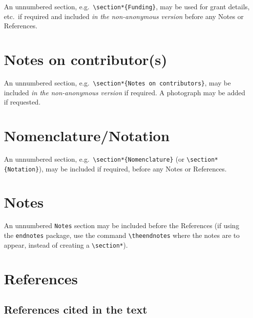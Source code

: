 \documentclass[]{interact}
\theoremstyle{plain}%
\theoremstyle{definition}
\theoremstyle{remark}
\begin{document}
An unnumbered section,
e.g.~\texttt{\textbackslash{}section*\{Funding\}}, may be used for grant
details, etc.~if required and included \emph{in the non-anonymous
version} before any Notes or References.

\hypertarget{notes-on-contributors}{%
\section*{Notes on contributor(s)}\label{notes-on-contributors}}

An unnumbered section,
e.g.~\texttt{\textbackslash{}section*\{Notes\ on\ contributors\}}, may
be included \emph{in the non-anonymous version} if required. A
photograph may be added if requested.

\hypertarget{nomenclaturenotation}{%
\section*{Nomenclature/Notation}\label{nomenclaturenotation}}

An unnumbered section,
e.g.~\texttt{\textbackslash{}section*\{Nomenclature\}} (or
\texttt{\textbackslash{}section*\{Notation\}}), may be included if
required, before any Notes or References.

\hypertarget{notes}{%
\section*{Notes}\label{notes}}

An unnumbered \texttt{Notes} section may be included before the
References (if using the \texttt{endnotes} package, use the command
\texttt{\textbackslash{}theendnotes} where the notes are to appear,
instead of creating a \texttt{\textbackslash{}section*}).

\hypertarget{references}{%
\section{References}\label{references}}

\hypertarget{references-cited-in-the-text}{%
\subsection{References cited in the
text}\label{references-cited-in-the-text}}
\end{document}
